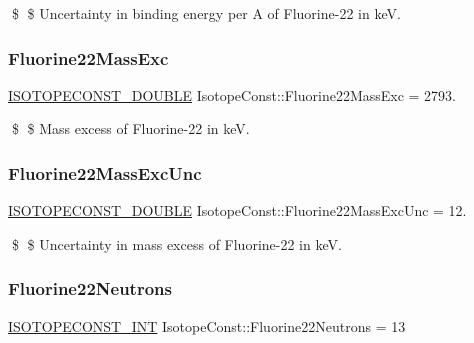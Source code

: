 \$ \$ Uncertainty in binding energy per A of Fluorine-\/22 in keV. \mbox{\label{group___isotope_const-_fluorine-_f22_ga9c44402b3f2e461e75b4cad8fc5f6346}} 
\subsubsection{\texorpdfstring{Fluorine22\+Mass\+Exc}{Fluorine22MassExc}}
{\footnotesize\ttfamily \mbox{\hyperlink{group___isotope_const-_macros_ga8f45a7272ce02c0b4c65c44636ed719a}{I\+S\+O\+T\+O\+P\+E\+C\+O\+N\+S\+T\+\_\+\+D\+O\+U\+B\+LE}} Isotope\+Const\+::\+Fluorine22\+Mass\+Exc = 2793.}

\$ \$ Mass excess of Fluorine-\/22 in keV. \mbox{\label{group___isotope_const-_fluorine-_f22_ga70ef43ecf8637c673132aebcbc64ba9c}} 
\subsubsection{\texorpdfstring{Fluorine22\+Mass\+Exc\+Unc}{Fluorine22MassExcUnc}}
{\footnotesize\ttfamily \mbox{\hyperlink{group___isotope_const-_macros_ga8f45a7272ce02c0b4c65c44636ed719a}{I\+S\+O\+T\+O\+P\+E\+C\+O\+N\+S\+T\+\_\+\+D\+O\+U\+B\+LE}} Isotope\+Const\+::\+Fluorine22\+Mass\+Exc\+Unc = 12.}

\$ \$ Uncertainty in mass excess of Fluorine-\/22 in keV. \mbox{\label{group___isotope_const-_fluorine-_f22_gaa7f70ae2ba33cb16c14ec610ca5721f2}} 
\subsubsection{\texorpdfstring{Fluorine22\+Neutrons}{Fluorine22Neutrons}}
{\footnotesize\ttfamily \mbox{\hyperlink{group___isotope_const-_macros_ga5f18360b3e99483a35c32d789e62621c}{I\+S\+O\+T\+O\+P\+E\+C\+O\+N\+S\+T\+\_\+\+I\+NT}} Isotope\+Const\+::\+Fluorine22\+Neutrons = 13}

